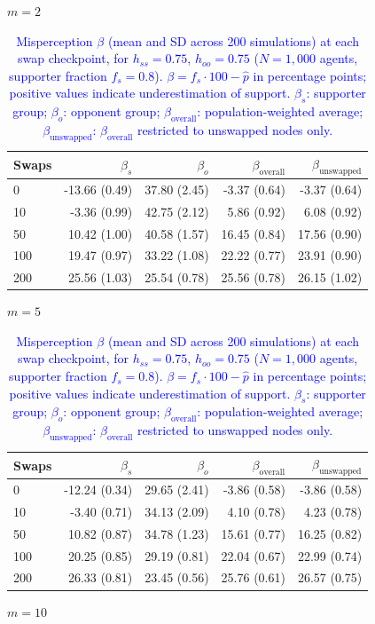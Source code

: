 \begin{table}[H]
\centering
\caption{\textcolor{blue}{Misperception $\beta$ (mean and SD across 200 simulations) at each swap checkpoint, for $h_{ss} = 0.75$, $h_{oo} = 0.75$ ($N = 1{,}000$ agents, supporter fraction $f_s = 0.8$). $\beta = f_s \cdot 100 - \hat{p}$ in percentage points; positive values indicate underestimation of support. $\beta_s$: supporter group; $\beta_o$: opponent group; $\beta_{\mathrm{overall}}$: population-weighted average; $\beta_{\mathrm{unswapped}}$: $\beta_{\mathrm{overall}}$ restricted to unswapped nodes only.}}
\label{tab:subset_fs08_hss750_hoo750}
\par\medskip
\noindent\textit{$m = 2$}\\[2pt]
\begin{tabular}{l rrrr}
\toprule
Swaps & $\beta_s$ & $\beta_o$ & $\beta_{\mathrm{overall}}$ & $\beta_{\mathrm{unswapped}}$ \\
\midrule
0 & -13.66 (0.49) & 37.80 (2.45) & -3.37 (0.64) & -3.37 (0.64) \\
10 & -3.36 (0.99) & 42.75 (2.12) & 5.86 (0.92) & 6.08 (0.92) \\
50 & 10.42 (1.00) & 40.58 (1.57) & 16.45 (0.84) & 17.56 (0.90) \\
100 & 19.47 (0.97) & 33.22 (1.08) & 22.22 (0.77) & 23.91 (0.90) \\
200 & 25.56 (1.03) & 25.54 (0.78) & 25.56 (0.78) & 26.15 (1.02) \\
\bottomrule
\end{tabular}
\par\medskip
\noindent\textit{$m = 5$}\\[2pt]
\begin{tabular}{l rrrr}
\toprule
Swaps & $\beta_s$ & $\beta_o$ & $\beta_{\mathrm{overall}}$ & $\beta_{\mathrm{unswapped}}$ \\
\midrule
0 & -12.24 (0.34) & 29.65 (2.41) & -3.86 (0.58) & -3.86 (0.58) \\
10 & -3.40 (0.71) & 34.13 (2.09) & 4.10 (0.78) & 4.23 (0.78) \\
50 & 10.82 (0.87) & 34.78 (1.23) & 15.61 (0.77) & 16.25 (0.82) \\
100 & 20.25 (0.85) & 29.19 (0.81) & 22.04 (0.67) & 22.99 (0.74) \\
200 & 26.33 (0.81) & 23.45 (0.56) & 25.76 (0.61) & 26.57 (0.75) \\
\bottomrule
\end{tabular}
\par\medskip
\noindent\textit{$m = 10$}\\[2pt]

\end{table}
